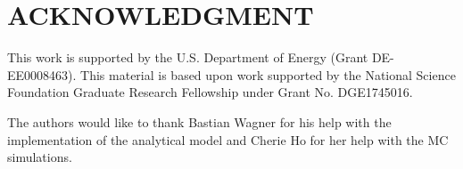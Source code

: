 \documentclass[letterpaper, 10 pt, conference]{ieeeconf}
\begin{document}
\section*{ACKNOWLEDGMENT}
This work is supported by the U.S. Department of Energy (Grant DE-EE0008463). This material is based upon work supported by the National Science Foundation Graduate Research Fellowship under Grant No. DGE1745016.

The authors would like to thank Bastian Wagner for his help with the implementation of the analytical model and Cherie Ho for her help with the MC simulations. 







\end{document}
